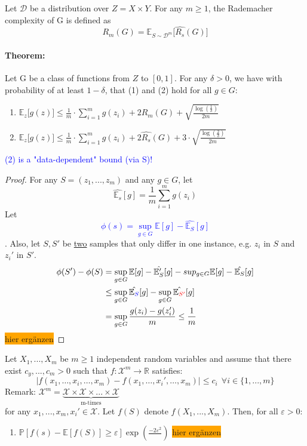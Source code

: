\documentclass[10pt,a4paper]{article}
\theoremstyle{remark}
\theoremstyle{definition}
\theoremstyle{plain}
\begin{document}
\begin{boxeddef}
	Let $\mathcal{D}$ be a distribution over $Z = X \times Y$. For any $m \geq 1$, the Rademacher complexity of G is defined as
	$$
		R_m(G) = \mathbb{E}_{S \sim \mathcal{D}^m} \big[\hat{R_s}(G)\big]
	$$
\end{boxeddef}

\paragraph{Theorem:} Let G be a class of functions from $Z$ to $[0,1]$. For any $\delta > 0$, we have with probability of at least $1-\delta$, that (1) and (2) hold for all $g \in G$:
\begin{enumerate}
	\item $\mathbb{E}_z \big[g(z)\big] \leq \frac{1}{m} \cdot \sum_{i = 1}^{m} g(z_i) + 2 R_m (G) + \sqrt{\frac{\log(\frac{1}{\delta})}{2m}}$
	\item $\mathbb{E}_z \big[g(z)\big] \leq \frac{1}{m} \cdot \sum_{i = 1}^{m} g(z_i) + 2 \hat{R_s} (G) + 3 \cdot \sqrt{\frac{\log(\frac{2}{\delta})}{2m}}$
\end{enumerate}
\textcolor{blue}{(2) is a "data-dependent" bound (via S)!}
\begin{proof}
	For any $S = (z_1, ..., z_m)$ and any $g \in G$, let
	$$
		\hat{\mathbb{E}_s}[g] = \frac{1}{m} \sum_{i = 1}^{m} g(z_i)
	$$
	Let \textcolor{blue}{$$\phi(s) = \sup_{g \in G} \mathbb{E}[g] - \hat{\mathbb{E}_S}[g]$$}. Also, let $S, S'$ be \underline{two} samples that only differ in one instance, e.g. $z_i$ in $S$ and $z_{i}'$ in $S'$.
	\begin{align*}
		\phi(S')-\phi(S) &= \sup_{g \in G} \mathbb{E}[g] - \hat{\mathbb{E}_S'}[g] - sup_{g \in G} \mathbb{E}[g] - \hat{\mathbb{E}_S}[g]\\
		&\leq  \sup_{g \in G} \hat{\mathbb{E}_{\textcolor{blue}{S}}}[g] - \sup_{g \in G} \hat{\mathbb{E}_{\textcolor{red}{S'}}}[g]\\
		&= \sup_{g \in G} \frac{g(z_i) - g(z_{i}')}{m} \leq \frac{1}{m}
	\end{align*}
	\colorbox{orange}{hier ergänzen}
\end{proof}

\begin{boxeddef}
	Let $X_1, ..., X_m$ be $m \geq 1$ independent random variables and assume that there exist $c_y, ..., c_m > 0$ such that $f: \mathcal{X}^m \to \mathbb{R}$ satisfies:
	$$
		\bigg|f(x_1, \hdots , x_i, \hdots, x_m) - f(x_1, \hdots, x_{i}', \hdots, x_m) \bigg| \leq c_i \ \ \forall i \in \{ 1, ..., m \}
	$$
	Remark: $\mathcal{X}^m = \underbrace{\mathcal{X} \times \mathcal{X} \times ... \times \mathcal{X}}_{\text{m-times}}$\\
	
	for any $x_1, ..., x_m, x_{i}' \in \mathcal{X}$. Let $f(S)$ denote $f(X_1, ..., X_m)$. Then, for all $\varepsilon > 0$:
	\begin{enumerate}
		\item $\mathbb{P}[f(s) - \mathbb{E}[f(S)] \geq \varepsilon] \exp (\frac{-2\varepsilon^2}{})$
		\colorbox{orange}{hier ergänzen}
	\end{enumerate}
\end{boxeddef}
\end{document}
